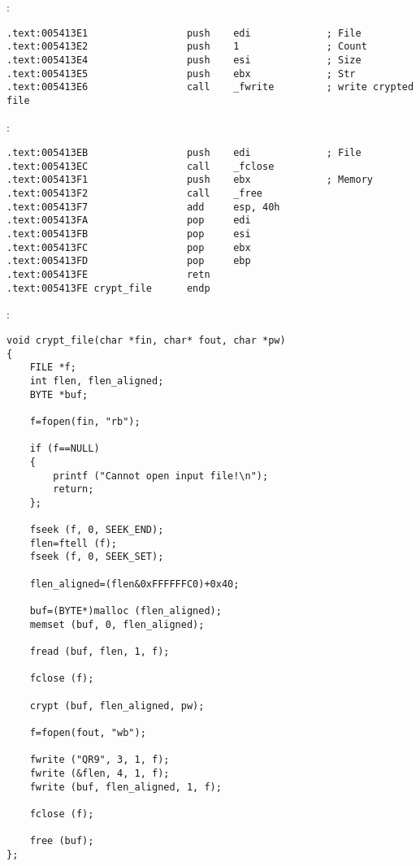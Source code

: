 :

\begin{lstlisting}
.text:005413E1                 push    edi             ; File
.text:005413E2                 push    1               ; Count
.text:005413E4                 push    esi             ; Size
.text:005413E5                 push    ebx             ; Str
.text:005413E6                 call    _fwrite         ; write crypted file
\end{lstlisting}

:

\begin{lstlisting}
.text:005413EB                 push    edi             ; File
.text:005413EC                 call    _fclose
.text:005413F1                 push    ebx             ; Memory
.text:005413F2                 call    _free
.text:005413F7                 add     esp, 40h
.text:005413FA                 pop     edi
.text:005413FB                 pop     esi
.text:005413FC                 pop     ebx
.text:005413FD                 pop     ebp
.text:005413FE                 retn
.text:005413FE crypt_file      endp
\end{lstlisting}

:

\begin{lstlisting}
void crypt_file(char *fin, char* fout, char *pw)
{
	FILE *f;
	int flen, flen_aligned;
	BYTE *buf;

	f=fopen(fin, "rb");
	
	if (f==NULL)
	{
		printf ("Cannot open input file!\n");
		return;
	};

	fseek (f, 0, SEEK_END);
	flen=ftell (f);
	fseek (f, 0, SEEK_SET);

	flen_aligned=(flen&0xFFFFFFC0)+0x40;

	buf=(BYTE*)malloc (flen_aligned);
	memset (buf, 0, flen_aligned);

	fread (buf, flen, 1, f);

	fclose (f);

	crypt (buf, flen_aligned, pw);
	
	f=fopen(fout, "wb");

	fwrite ("QR9", 3, 1, f);
	fwrite (&flen, 4, 1, f);
	fwrite (buf, flen_aligned, 1, f);

	fclose (f);

	free (buf);
};
\end{lstlisting}


